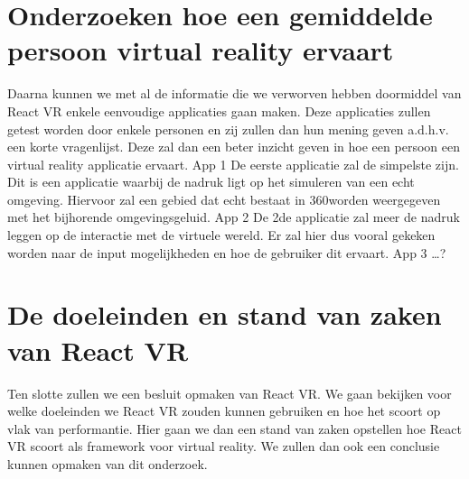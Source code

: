 \section{Onderzoeken hoe een gemiddelde persoon virtual reality ervaart}
\label{sec:ervaring-vr-app}
Daarna kunnen we met al de informatie die we verworven hebben doormiddel van React VR enkele eenvoudige applicaties gaan maken. Deze applicaties zullen getest worden door enkele personen en zij zullen dan hun mening geven a.d.h.v. een korte vragenlijst. Deze zal dan een beter inzicht geven in hoe een persoon een virtual reality applicatie ervaart.
App 1
De eerste applicatie zal de simpelste zijn. Dit is een applicatie waarbij de nadruk ligt op het simuleren van een echt omgeving. Hiervoor zal een gebied dat echt bestaat in 360\textdegree worden weergegeven met het bijhorende omgevingsgeluid. 
App 2
De 2de applicatie zal meer de nadruk leggen op de interactie met de virtuele wereld. Er zal hier dus vooral gekeken worden naar de input mogelijkheden en hoe de gebruiker dit ervaart.
App 3
…?

\section{De doeleinden en stand van zaken van React VR}
\label{sec:doeleinden-reactvr}
Ten slotte zullen we een besluit opmaken van React VR. We gaan bekijken voor welke doeleinden we React VR zouden kunnen gebruiken en hoe het scoort op vlak van performantie. Hier gaan we dan een stand van zaken opstellen hoe React VR scoort als framework voor virtual reality. We zullen dan ook een conclusie kunnen opmaken van dit onderzoek.



